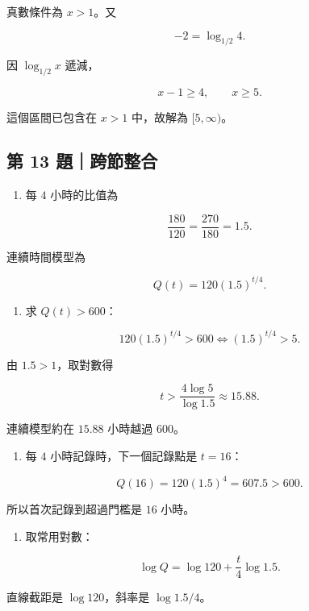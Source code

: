 \documentclass[11pt,a4paper]{article}
\providecommand{\tightlist}{%
  \setlength{\itemsep}{0pt}\setlength{\parskip}{0pt}}
\begin{document}
真數條件為 \(x>1\)。又

\[
-2=\log_{1/2}4.
\]

因 \(\log_{1/2}x\) 遞減，

\[
x-1\ge4,\qquad x\ge5.
\]

這個區間已包含在 \(x>1\) 中，故解為 \([5,\infty)\)。

\subsection{第 13 題｜跨節整合}\label{ux7b2c-13-ux984cux8de8ux7bc0ux6574ux5408}

\begin{enumerate}
\def\labelenumi{(\alph{enumi})}
\tightlist
\item
  每 \(4\) 小時的比值為
\end{enumerate}

\[
\frac{180}{120}=\frac{270}{180}=1.5.
\]

連續時間模型為

\[
Q(t)=120(1.5)^{t/4}.
\]

\begin{enumerate}
\def\labelenumi{(\alph{enumi})}
\setcounter{enumi}{1}
\tightlist
\item
  求 \(Q(t)>600\)：
\end{enumerate}

\[
120(1.5)^{t/4}>600
\Longleftrightarrow
(1.5)^{t/4}>5.
\]

由 \(1.5>1\)，取對數得

\[
t>\frac{4\log5}{\log1.5}\approx15.88.
\]

連續模型約在 \(15.88\) 小時越過 \(600\)。

\begin{enumerate}
\def\labelenumi{(\alph{enumi})}
\setcounter{enumi}{2}
\tightlist
\item
  每 \(4\) 小時記錄時，下一個記錄點是 \(t=16\)：
\end{enumerate}

\[
Q(16)=120(1.5)^4=607.5>600.
\]

所以首次記錄到超過門檻是 \(16\) 小時。

\begin{enumerate}
\def\labelenumi{(\alph{enumi})}
\setcounter{enumi}{3}
\tightlist
\item
  取常用對數：
\end{enumerate}

\[
\log Q=\log120+\frac{t}{4}\log1.5.
\]

直線截距是 \(\log120\)，斜率是 \(\log1.5/4\)。
\end{document}
